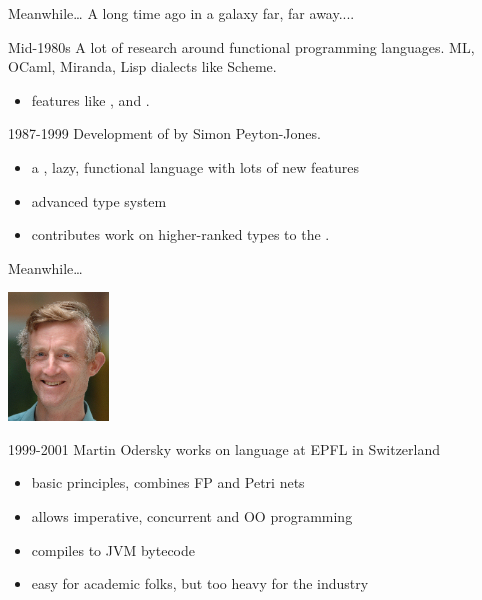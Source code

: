 \begin{frame}{Meanwhile\ldots}
A long time ago in a galaxy far, far away....
\begin{block}{Mid-1980s}
A lot of research around functional programming languages. ML, OCaml, Miranda,
Lisp dialects like Scheme.
\begin{itemize}
  \item features like , 
  and .
\end{itemize}
\end{block}
\pause
\begin{block}{1987-1999}
Development of  by Simon Peyton-Jones.
\begin{itemize}
  \item a , lazy, functional language with lots of new features
  \item advanced type system
  \item {} contributes work on higher-ranked types to
  the .
\end{itemize}
\end{block}
\end{frame}

\begin{frame}{Meanwhile\ldots}
\begin{center}
\includegraphics[width=0.2\textwidth]{resources/SimonPeytonJones.jpg}
\end{center}
\begin{block}{1999-2001}
Martin Odersky works on  language at EPFL in Switzerland
\begin{itemize}
  \item basic principles, combines FP and Petri nets
  \item allows imperative, concurrent and OO programming
  \item compiles to JVM bytecode
  \item \alert{easy for academic folks, but too heavy for the industry}
\end{itemize}
\end{block}
\end{frame}

